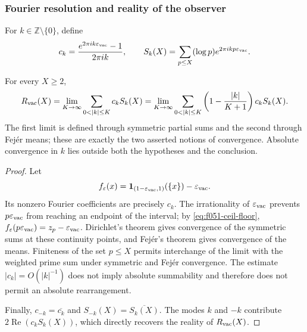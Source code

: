 \subsubsection{Fourier resolution and reality of the observer}

For \(k\in\mathbb Z\setminus\{0\}\), define
\begin{equation}
 c_k=\frac{e^{2\pi i k\varepsilon_{\rm vac}}-1}{2\pi i k},
 \qquad
 S_k(X)=\sum_{p\leq X}(\log p)
             e^{2\pi i k p\varepsilon_{\rm vac}}.
 \label{eq:f051-fourier-data}
\end{equation}

\begin{proposition}
\label{prop:f051-fourier-resolution}
For every \(X\geq2\),
\begin{equation}
 R_{\rm vac}(X)
 =\lim_{K\to\infty}
   \sum_{0<|k|\leq K}c_kS_k(X)
 =\lim_{K\to\infty}
   \sum_{0<|k|\leq K}
   \left(1-\frac{|k|}{K+1}\right)c_kS_k(X).
 \label{eq:f051-fourier-pair}
\end{equation}
The first limit is defined through symmetric partial sums and the second
through Fej\'er means; these are exactly the two asserted notions of
convergence. Absolute convergence in \(k\) lies outside both the
hypotheses and the conclusion.
\end{proposition}

\begin{proof}
Let
\[
 f_{\varepsilon}(x)
 =\mathbf1_{(1-\varepsilon_{\rm vac},1)}(\{x\})
  -\varepsilon_{\rm vac}.
\]
Its nonzero Fourier coefficients are precisely \(c_k\). The irrationality
of \(\varepsilon_{\rm vac}\) prevents
\(p\varepsilon_{\rm vac}\) from reaching an endpoint of the interval; by
\eqref{eq:f051-ceil-floor},
\(f_{\varepsilon}(p\varepsilon_{\rm vac})
 =z_p-\varepsilon_{\rm vac}\). Dirichlet's theorem gives convergence of
the symmetric sums at these continuity points, and Fej\'er's theorem gives
convergence of the means. Finiteness of the set \(p\leq X\) permits
interchange of the limit with the weighted prime sum under symmetric and
Fej\'er convergence. The estimate \(|c_k|=O(|k|^{-1})\) does not imply
absolute summability and therefore does not permit an absolute
rearrangement.

Finally,
\(c_{-k}=\overline{c_k}\) and
\(S_{-k}(X)=\overline{S_k(X)}\). The modes \(k\) and \(-k\) contribute
\(2\operatorname{Re}(c_kS_k(X))\), which directly recovers the reality of
\(R_{\rm vac}(X)\).
\end{proof}

